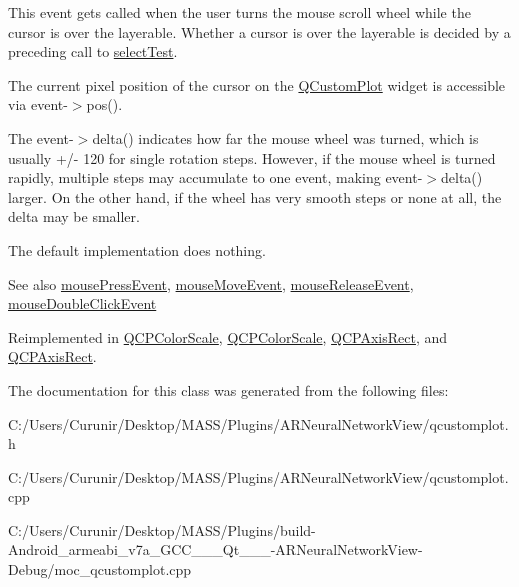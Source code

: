 This event gets called when the user turns the mouse scroll wheel while the cursor is over the layerable. Whether a cursor is over the layerable is decided by a preceding call to \hyperlink{class_q_c_p_layerable_a04db8351fefd44cfdb77958e75c6288e}{select\+Test}.

The current pixel position of the cursor on the \hyperlink{class_q_custom_plot}{Q\+Custom\+Plot} widget is accessible via {\ttfamily event-\/$>$pos()}.

The {\ttfamily event-\/$>$delta()} indicates how far the mouse wheel was turned, which is usually +/-\/ 120 for single rotation steps. However, if the mouse wheel is turned rapidly, multiple steps may accumulate to one event, making {\ttfamily event-\/$>$delta()} larger. On the other hand, if the wheel has very smooth steps or none at all, the delta may be smaller.

The default implementation does nothing.

\begin{DoxySeeAlso}{See also}
\hyperlink{class_q_c_p_layerable_af6567604818db90f4fd52822f8bc8376}{mouse\+Press\+Event}, \hyperlink{class_q_c_p_layerable_a9eee1ba47fd69be111059ca3881933e4}{mouse\+Move\+Event}, \hyperlink{class_q_c_p_layerable_aa0d79b005686f668622bbe66ac03ba2c}{mouse\+Release\+Event}, \hyperlink{class_q_c_p_layerable_a4171e2e823aca242dd0279f00ed2de81}{mouse\+Double\+Click\+Event} 
\end{DoxySeeAlso}


Reimplemented in \hyperlink{class_q_c_p_color_scale_a63cf19be184f6670c9495ad3a9a1baeb}{Q\+C\+P\+Color\+Scale}, \hyperlink{class_q_c_p_color_scale_a5cda10e845bfe04ed63efd55acc212ae}{Q\+C\+P\+Color\+Scale}, \hyperlink{class_q_c_p_axis_rect_a93eeaa0c127d6d6fe8171b2455080262}{Q\+C\+P\+Axis\+Rect}, and \hyperlink{class_q_c_p_axis_rect_a2ca1c7bf10a472147df1b7d7bc6bfe93}{Q\+C\+P\+Axis\+Rect}.



The documentation for this class was generated from the following files\+:\begin{DoxyCompactItemize}
\item 
C\+:/\+Users/\+Curunir/\+Desktop/\+M\+A\+S\+S/\+Plugins/\+A\+R\+Neural\+Network\+View/qcustomplot.\+h\item 
C\+:/\+Users/\+Curunir/\+Desktop/\+M\+A\+S\+S/\+Plugins/\+A\+R\+Neural\+Network\+View/qcustomplot.\+cpp\item 
C\+:/\+Users/\+Curunir/\+Desktop/\+M\+A\+S\+S/\+Plugins/build-\/\+Android\+\_\+armeabi\+\_\+v7a\+\_\+\+G\+C\+C\+\_\+\_\+\_\+\+Qt\+\_\+\_\+\_-\/\+A\+R\+Neural\+Network\+View-\/\+Debug/moc\+\_\+qcustomplot.\+cpp\end{DoxyCompactItemize}
